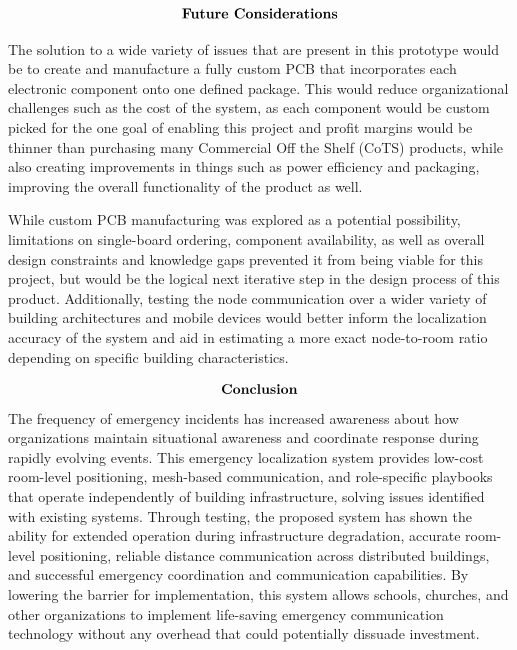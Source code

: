 \documentclass[english,12pt,a4paper,titlepage]{article}
\begin{document}
	\[
	\begin{array}{cc}
		\mbox{\bfseries{Future Considerations}}
		\label{Future Considerations}
	\end{array}
	\]
	
	The solution to a wide variety of issues that are present in this prototype would be to create and manufacture a fully custom PCB that incorporates each electronic component onto one defined package. This would reduce organizational challenges such as the cost of the system, as each component would be custom picked for the one goal of enabling this project and profit margins would be thinner than purchasing many Commercial Off the Shelf (CoTS) products, while also creating improvements in things such as power efficiency and packaging, improving the overall functionality of the product as well. 
	
	While custom PCB manufacturing was explored as a potential possibility, limitations on single-board ordering, component availability, as well as overall design constraints and knowledge gaps prevented it from being viable for this project, but would be the logical next iterative step in the design process of this product. Additionally, testing the node communication over a wider variety of building architectures and mobile devices would better inform the localization accuracy of the system and aid in estimating a more exact node-to-room ratio depending on specific building characteristics. 
	
	\[
	\begin{array}{cc}
		\mbox{\bfseries{Conclusion}}
		\label{Conclusions}
	\end{array}
	\]
	The frequency of emergency incidents has increased awareness about how organizations maintain situational awareness and coordinate response during rapidly evolving events. This emergency localization system provides low-cost room-level positioning, mesh-based communication, and role-specific playbooks that operate independently of building infrastructure, solving issues identified with existing systems. Through  testing, the proposed system has shown the ability for extended operation during infrastructure degradation, accurate room-level positioning, reliable distance communication across distributed buildings, and successful emergency coordination and communication capabilities. By lowering the barrier for implementation, this system allows schools, churches, and other organizations to implement life-saving emergency communication technology without any overhead that could potentially dissuade investment.
	
\end{document}
